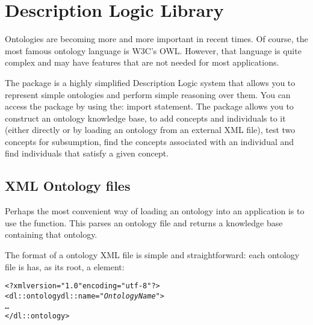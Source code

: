 \chapter{Description Logic Library}
\label{dl}
Ontologies are becoming more and more important in recent times. Of course, the most famous ontology language is W3C's OWL. However, that language is quite complex and may have features that are not needed for most applications.

The  package is a highly simplified Description Logic system that allows you to represent simple ontologies and perform simple reasoning over them. You can access the  package by using the:
import statement.
The  package allows you to construct an ontology knowledge base, to add concepts and individuals to it (either directly or by loading an ontology from an external XML file), test two concepts for subsumption, find the concepts associated with an individual and find individuals that satisfy a given concept.

\section{XML Ontology files}
\label{dl:xml}

Perhaps the most convenient way of loading an ontology into an application is to use the  function. This parses an ontology file and returns a knowledge base containing that ontology.

The format of a  ontology XML file is simple and straightforward: each ontology file is has, as its root, a  element:
\begin{alltt}
<?xml version="1.0" encoding="utf-8"?>
<dl::ontology dl::name="\emph{OntologyName}">
  \ldots
</dl::ontology>
\end{alltt}

